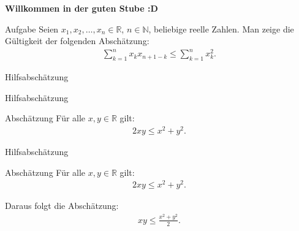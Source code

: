 \documentclass[10pt]{beamer}
\title{}
\author{Artur's \( \oint \) Mathematikstübchen}
\date{}
\def\bN{\mathbb{N}}
\def\bR{\mathbb{R}}
\begin{document}

\begin{frame}
    \begin{center}
        \textbf{\huge Willkommen in der guten Stube \newline \newline :D}
    \end{center}
\end{frame}




\begin{frame}
    \begin{alertblock}{Aufgabe}
        Seien \( x_{1}, x_{2}, \ldots, x_{n} \in \bR \), \( n \in \bN \), beliebige reelle Zahlen. Man zeige die Gültigkeit der folgenden Abschätzung:
        \begin{align*}
            \sum_{k = 1}^{n} x_{k}x_{n + 1 - k}
            \leq \sum_{k = 1}^{n} x_{k}^{2}.
        \end{align*}
    \end{alertblock}
\end{frame}



\begin{frame}{Hilfsabschätzung}
    
\end{frame}



\begin{frame}{Hilfsabschätzung}
    \begin{block}{Abschätzung}
        Für alle \( x, y \in \bR \) gilt:
        \begin{align*}
            2xy 
            \leq x^{2} + y^{2}.
        \end{align*}
    \end{block}
\end{frame}



\begin{frame}{Hilfsabschätzung}
    \begin{block}{Abschätzung}
        Für alle \( x, y \in \bR \) gilt:
        \begin{align*}
            2xy 
            \leq x^{2} + y^{2}.
        \end{align*}
    \end{block}
    Daraus folgt die Abschätzung:
    \begin{align*}
        xy
        \leq \frac{x^{2} + y^{2}}{2}.
    \end{align*}
\end{frame}
\end{document}
